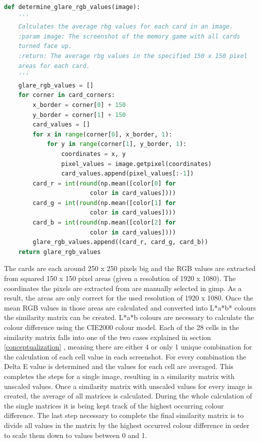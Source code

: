 \begin{lstlisting}[language=python, caption=Code for calculating the average rgb values of each card in an image., xleftmargin=5.0ex]
def determine_glare_rgb_values(image):
	'''
	Calculates the average rbg values for each card in an image.
	:param image: The screenshot of the memory game with all cards 
	turned face up.
	:return: The average rbg values in the specified 150 x 150 pixel 
	areas for each card. 
	'''
	glare_rgb_values = []
	for corner in card_corners:
		x_border = corner[0] + 150
		y_border = corner[1] + 150
		card_values = []
		for x in range(corner[0], x_border, 1):
			for y in range(corner[1], y_border, 1):
				coordinates = x, y
				pixel_values = image.getpixel(coordinates)
				card_values.append(pixel_values[:-1])
		card_r = int(round(np.mean([color[0] for 
						color in card_values])))
		card_g = int(round(np.mean([color[1] for 
						color in card_values])))
		card_b = int(round(np.mean([color[2] for 
						color in card_values])))
		glare_rgb_values.append((card_r, card_g, card_b))
	return glare_rgb_values 
\end{lstlisting}
The cards are each around 250 x 250 pixels big and the RGB values are extracted from squared 150 x 150 pixel areas (given a resolution of 1920 x 1080). The coordinates the pixels are extracted from are manually selected in gimp. As a result, the areas are only correct for the used resolution of 1920 x 1080. Once the mean RGB values in those areas are calculated and converted into L*a*b* colours the similarity matrix can be created. L*a*b colours are necessary to calculate the colour difference using the CIE2000 colour model. Each of the 28 cells in the similarity matrix falls into one of the two cases explained in section \ref{conceptualization} , meaning there are either 4 or only 1 unique combination for the calculation of each cell value in each screenshot. For every combination the Delta E value is determined and the values for each cell are averaged. This completes the steps for a single image, resulting in a similarity matrix with unscaled values. 
%	
Once a similarity matrix with unscaled values for every image is created, the average of all matrices is calculated. During the whole calculation of the single matrices it is being kept track of the highest occurring colour difference. The last step necessary to complete the final similarity matrix is to divide all values in the matrix by the highest occurred colour difference in order to  scale them down to values between 0 and 1. 

